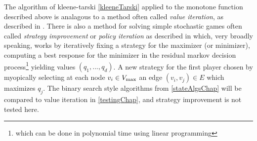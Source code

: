 \begin{remark}
  The algorithm of kleene-tarski \cref{kleeneTarski} applied to the monotone function described above
  is analagous to a method often called \emph{value iteration}, as described in \citep{valueIteration}.
  There is also a method for solving simple stochastic games often called \emph{strategy improvement}
  or \emph{policy iteration} as described in \citep{hoffmanKarp} 
  which, very broadly speaking, works by iteratively fixing a strategy for the maximizer (or minimizer),
  computing a best response for the minimizer in the residual markov decision process\footnote{which can be
  done in polynomial time using linear programming} yielding values $(q_1, ..., q_d)$. 
  A new strategy for the first player
  chosen by myopically selecting at each node $v_i \in V_{\max}$ an edge $(v_i, v_j) \in E$ 
  which maximizes $q_j$.
  The binary search style algorithms from \cref{stateAlgsChap} will be compared to value iteration in \cref{testingChap}, and strategy improvement
  is not tested here.
\end{remark}
